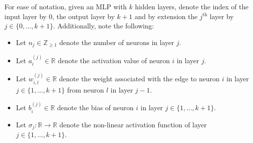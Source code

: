 \documentclass[11pt]{article}
\begin{document}
For ease of notation, given an MLP with $k$ hidden layers, denote the index of the input layer by $0$, the output layer by $k+1$ and by extension the $j^{\text{th}}$ layer by $j\in\{0,\dots,k+1\}$. Additionally, note the following:
\begin{itemize}
    \item Let $n_j\in\mathbb{Z}_{\geq1}$ denote the number of neurons in layer $j$.
    \item Let $a_i^{(j)}\in\mathbb{R}$ denote the activation value of neuron $i$ in layer $j$.
    \item Let $w_{i,l}^{(j)}\in\mathbb{R}$ denote the weight associated with the edge to neuron $i$ in layer $j\in\{1,\dots,k+1\}$ from neuron $l$ in layer $j-1$.
    \item Let $b_i^{(j)}\in\mathbb{R}$ denote the bias of neuron $i$ in layer $j\in\{1,\dots,k+1\}$.
    \item Let $\sigma_j:\mathbb{R}\rightarrow\mathbb{R}$ denote the non-linear activation function of layer $j\in\{1,\dots,k+1\}$.
\end{itemize}
\end{document}
